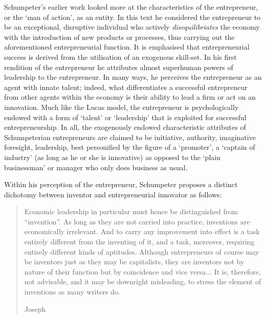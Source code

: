 Schumpeter's earlier work looked more at the characteristics of the entrepreneur, or the `man of action', as an entity. In this text he considered the entrepreneur to be an exceptional, disruptive individual who actively \emph{disequilibriates} the economy with the introduction of new products or processes, thus carrying out the aforementioned entrepreneurial function. It is emphasised that entrepreneurial success is derived from the utilisation of an exogenous skill-set. In his first rendition of the entrepreneur he attributes almost superhuman powers of leadership to the entrepreneur. In many ways, he perceives the entrepreneur as an agent with innate talent; indeed, what differentiates a successful entrepreneur from other agents within the economy is their ability to lead a firm or act on an innovation. Much like the Lucas model, the entrepreneur is psychologically endowed with a form of `talent' or `leadership' that is exploited for successful entrepreneurship. In all, the exogenously endowed characteristic attributes of Schumpeterian entrepreneurs are claimed to be initiative, authority, imaginative foresight, leadership, best personified by the figure of a `promoter', a `captain of industry' (as long as he or she is innovative) as opposed to the `plain businessman' or manager who only does business as usual.

Within his perception of the entrepreneur, Schumpeter proposes a distinct dichotomy between inventor and entrepreneurial innovator as follows:

\begin{quote}
Economic leadership in particular must hence be distinguished from ``invention''. As long as they are not carried into practice, inventions are economically irrelevant. And to carry any improvement into effect is a task entirely different from the inventing of it, and a task, moreover, requiring entirely different kinds of aptitudes. Although entrepreneurs of course may be inventors just as they may be capitalists, they are inventors not by nature of their function but by coincidence and vice versa... It is, therefore, not advisable, and it may be downright misleading, to stress the element of inventions as many writers do.

\begin{flushright}
Joseph \citet[p.~88--89]{Schumpeter1934}
\end{flushright}
\end{quote}

